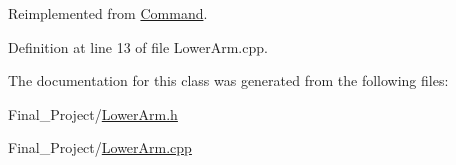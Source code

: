 Reimplemented from \hyperlink{classCommand_ae5846b4332a262e055c7a96759fa18f2}{Command}.



Definition at line 13 of file Lower\-Arm.\-cpp.



The documentation for this class was generated from the following files\-:\begin{DoxyCompactItemize}
\item 
Final\-\_\-\-Project/\hyperlink{LowerArm_8h}{Lower\-Arm.\-h}\item 
Final\-\_\-\-Project/\hyperlink{LowerArm_8cpp}{Lower\-Arm.\-cpp}\end{DoxyCompactItemize}

